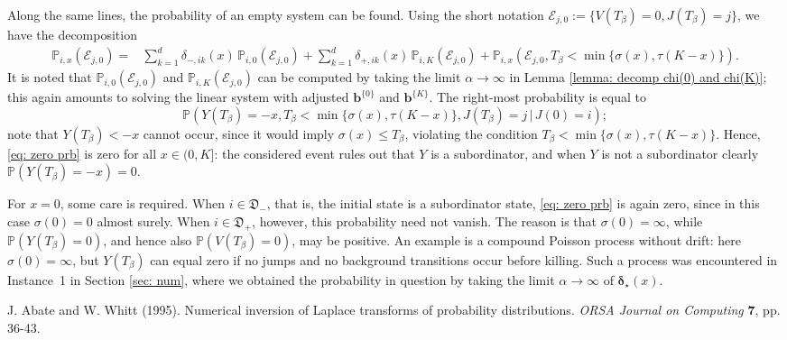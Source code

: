 \documentclass[reqno,12pt]{amsart}
\newcommand{\bs}{\boldsymbol}
\newcommand{\defDmin}{{\mathfrak D}_-}
\newcommand{\defDplus}{{\mathfrak D}_+}
\begin{document}
{\medskip

Along the same lines, the probability of an empty system can be found. Using the short notation ${\mathscr E}_{j,0}:=\{V(T_\beta) = 0, J(T_\beta) = j\}$, we have the decomposition
\begin{align*}
    \mathbb{P}_{i,x}({\mathscr E}_{j,0}) =& \sum_{k=1}^d\delta_{-,ik}(x)\,\mathbb{P}_{i,0}({\mathscr E}_{j,0})+\sum_{k=1}^d\delta_{+,ik}(x)\,\mathbb{P}_{i,K}({\mathscr E}_{j,0})+ \mathbb{P}_{i,x}({\mathscr E}_{j,0}, T_\beta<\min\{\sigma(x), \tau(K-x)\}).
\end{align*}
It is noted that $\mathbb{P}_{i,0}({\mathscr E}_{j,0})$ and $\mathbb{P}_{i,K}({\mathscr E}_{j,0})$ can be computed by taking the limit $\alpha\to \infty$ in Lemma \ref{lemma: decomp chi(0) and chi(K)}; this again amounts to solving the linear system with adjusted ${\bs b}^{\{0\}}$ and ${\bs b}^{\{K\}}$. The right-most probability is equal to
\begin{equation}
    \mathbb{P} (Y(T_\beta) = -x, T_\beta<\min\{\sigma(x), \tau(K-x)\}, J(T_\beta) = j\,|\,J(0)=i); \label{eq: zero prb}
\end{equation}
{note that $Y(T_\beta)<-x$ cannot occur, since it would imply $\sigma(x)\leqslant T_\beta$, violating the condition $T_\beta<\min\{\sigma(x), \tau(K-x)\}$. Hence, \eqref{eq: zero prb} is zero for all $x\in(0,K]$: the considered event rules out that $Y$ is a subordinator, and when $Y$ is not a subordinator clearly ${\mathbb P}(Y(T_\beta)=-x)=0$.}

{For $x=0$, some care is required. When $i\in\defDmin $, that is, the initial state is a subordinator state, \eqref{eq: zero prb} is again zero, since in this case $\sigma(0)=0$ almost surely. When $i\in\defDplus $, however, this probability need not vanish. The reason is that $\sigma(0)=\infty$, while ${\mathbb P}(Y(T_\beta)=0)$, and hence also ${\mathbb P}(V(T_\beta)=0)$, may be positive. An example is a compound Poisson process without drift: here $\sigma(0)=\infty$, but $Y(T_\beta)$ can equal zero if no jumps and no background transitions occur before killing. Such a process was encountered in Instance~1 in Section \ref{sec: num}, where we obtained the probability in question by taking the limit $\alpha\to\infty$ of ${\bs\delta}_\star(x)$.}



{\small
\begin{thebibliography}{99}%

{\sc J. Abate} and {\sc W. Whitt} (1995).
Numerical inversion of Laplace transforms of probability distributions. {\it ORSA Journal on Computing} {\bf 7}, pp. 36-43.


\end{thebibliography}}}
\end{document}
